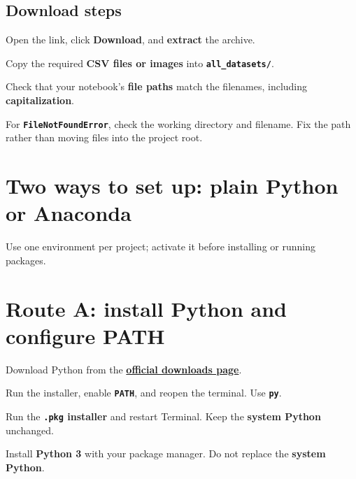 \subsection{Download steps}

\begin{utpsteps}
  \item Open the link, click \textbf{Download}, and \textbf{extract} the archive.
  \item Copy the required \textbf{CSV files or images} into \textbf{\texttt{all\_datasets/}}.
  \item Check that your notebook's \textbf{file paths} match the filenames, including \textbf{capitalization}.
\end{utpsteps}

\begin{pitfall}
For \textbf{\texttt{FileNotFoundError}}, check the working directory and filename. Fix the path rather than moving files into the project root.
\end{pitfall}

\section{Two ways to set up: plain Python or Anaconda}

\begin{keyidea}
Use one environment per project; activate it before installing or running packages.
\end{keyidea}

\section{Route A: install Python and configure PATH}

Download Python from the \href{https://www.python.org/downloads/}{\textbf{official downloads page}}.

\begin{description}[leftmargin=1.15in,style=nextline]
  \item[Windows] Run the installer, enable \textbf{\texttt{PATH}}, and reopen the terminal. Use \textbf{\texttt{py}}.
  \item[macOS] Run the \textbf{\texttt{.pkg} installer} and restart Terminal. Keep the \textbf{system Python} unchanged.
  \item[Linux] Install \textbf{Python 3} with your package manager. Do not replace the \textbf{system Python}.
\end{description}

